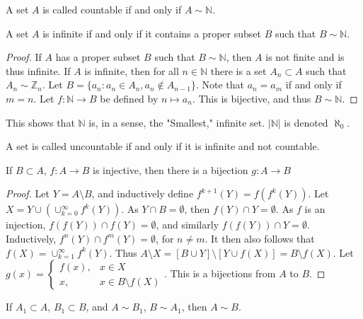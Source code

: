 \documentclass[crop=false,class=article,oneside]{standalone}
\begin{document}
        \begin{definition}
        A set $A$ is called countable if and only if $A\sim \mathbb{N}$.
        \end{definition}
        \begin{theorem}
        A set $A$ is infinite if and only if it contains a proper subset $B$ such that $B\sim \mathbb{N}$.
        \end{theorem}
        \begin{proof}
        If $A$ has a proper subset $B$ such that $B\sim \mathbb{N}$, then $A$ is not finite and is thus infinite. If $A$ is infinite, then for all $n\in \mathbb{N}$ there is a set $A_n\subset A$ such that $A_n \sim \mathbb{Z}_n$. Let $B = \{a_n: a_n \in A_n, a_n \notin A_{n-1}\}$. Note that $a_{n} = a_{m}$ if and only if $m= n$. Let $f:\mathbb{N} \rightarrow B$ be defined by $n\mapsto a_n$. This is bijective, and thus $B\sim \mathbb{N}$.
        \end{proof}
        \begin{remark}
        This shows that $\mathbb{N}$ is, in a sense, the "Smallest," infinite set. $|\mathbb{N}|$ is denoted $\aleph_0$.
        \end{remark}
        \begin{definition}
        A set is called uncountable if and only if it is infinite and not countable.
        \end{definition}
        \begin{lemma}
        If $B\subset A$, $f:A\rightarrow B$ is injective, then there is a bijection $g:A\rightarrow B$
        \end{lemma}
        \begin{proof}
        Let $Y = A\setminus B$, and inductively define $f^{k+1}(Y) = f(f^{k}(Y))$. Let $X = Y\cup (\cup_{k=0}^{\infty} f^{k}(Y))$. As $Y\cap B = \emptyset$, then $f(Y)\cap Y= \emptyset$. As $f$ is an injection, $f(f(Y))\cap f(Y)=\emptyset$, and similarly $f(f(Y))\cap Y = \emptyset$. Inductively, $f^{n}(Y)\cap f^{m}(Y) = \emptyset$, for $n\ne m$. It then also follows that $f(X) = \cup_{k=1}^{\infty} f^{k}(Y)$. Thus $A\setminus X = [B\cup Y]\setminus [Y\cup f(X)] = B\setminus f(X)$. Let $g(x) = \begin{cases} f(x), & x\in X \\ x, & x \in B\setminus f(X)\end{cases}$. This is a bijections from $A$ to $B$.
        \end{proof}
        \begin{theorem}
        If $A_1 \subset A$, $B_1 \subset B$, and $A\sim B_1$, $B \sim A_1$, then $A\sim B$.
        \end{theorem}
\end{document}
